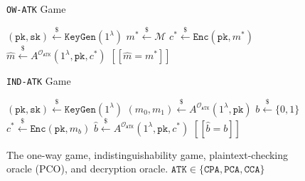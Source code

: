 \documentclass[runningheads]{llncs}
\newcommand{\keygen}{\texttt{KeyGen}}
\newcommand{\encrypt}{\texttt{Enc}}
\newcommand{\decrypt}{\texttt{Dec}}
\newcommand{\pk}{\texttt{pk}}
\newcommand{\sk}{\texttt{sk}}
\newcommand{\pco}{\texttt{PCO}}
\newcommand{\leftsample}{\stackrel{\$}{\leftarrow}}
\newcommand{\llbrack}{[\![}
\newcommand{\rrbrack}{]\!]}
\begin{document}
\begin{figure}[h]
    \centering

    \begin{minipage}[t]{0.4\textwidth}
        \begin{algorithm}[H]
            \caption*{\texttt{OW-ATK} Game}
            \begin{algorithmic}[1]
                \State $(\pk, \sk) \leftsample \keygen(1^\lambda)$
                \State $m^\ast \leftsample \mathcal{M}$
                \State $c^\ast \leftsample \encrypt(\pk, m^\ast)$
                \State $\hat{m} \leftsample A^{\mathcal{O}_\texttt{ATK}}(1^\lambda, \pk, c^\ast)$
                \State \Return $\llbrack \hat{m} = m^\ast \rrbrack$
            \end{algorithmic}
        \end{algorithm}
    \end{minipage}
    \begin{minipage}[t]{0.4\textwidth}
        \begin{algorithm}[H]
            \caption*{\texttt{IND-ATK} Game}
            \begin{algorithmic}[1]
                \State $(\pk, \sk) \leftsample \keygen(1^\lambda)$
                \State $(m_0, m_1) \leftsample A^{\mathcal{O}_\texttt{ATK}}(1^\lambda, \pk)$
                \State $b \leftsample \{0,1\}$
                \State $c^\ast \leftsample \encrypt(\pk, m_b)$
                \State $\hat{b} \leftsample A^{\mathcal{O}_\texttt{ATK}}(1^\lambda, \pk, c^\ast)$
                \State \Return $\llbrack \hat{b} = b \rrbrack$
            \end{algorithmic}
        \end{algorithm}
    \end{minipage}
    \caption{The one-way game, indistinguishability game, plaintext-checking oracle (PCO), and decryption oracle. $\texttt{ATK} \in \{\texttt{CPA}, \texttt{PCA}, \texttt{CCA}\}$}
\end{figure}
\end{document}
